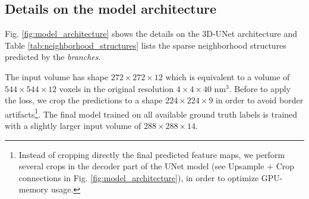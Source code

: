 \subsection{Details on the model architecture}\label{sec:arch_details_suppl}
Fig. \ref{fig:model_architecture} shows the details on the 3D-UNet architecture and Table \ref{tab:neighborhood_structures} lists the sparse neighborhood structures predicted by the \emph{\sparseBr branches}.

The input volume has shape $272 \times 272\times12$ which is equivalent to a volume of $544\times 544\times 12$ voxels in the original resolution $4\times 4\times 40$ nm$^3$. Before to apply the loss, we crop the predictions to a shape $224\times 224\times 9$ in order to avoid border artifacts\footnote{Instead of cropping directly the final predicted feature maps, we perform several crops in the decoder part of the UNet model (see Upsample + Crop connections in Fig. \ref{fig:model_architecture}), in order to optimize GPU-memory usage.}.
The final model trained on all available ground truth labels is trained with a slightly larger input volume of $288\times 288\times 14$.









